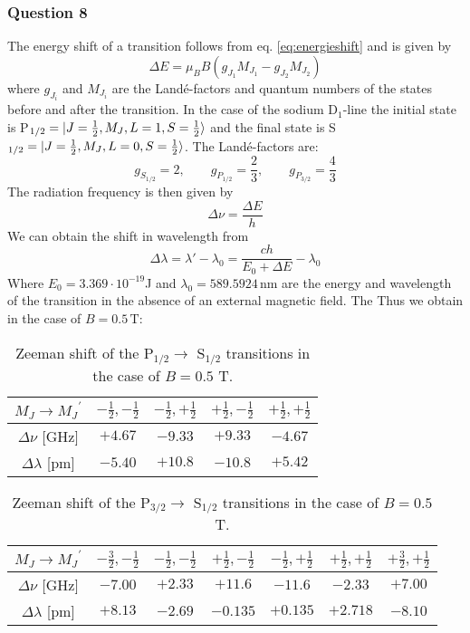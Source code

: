 \subsubsection{Question 8}
The energy shift of a transition follows from eq. \eqref{eq:energieshift} and is given by
\begin{equation}\Delta E=\mu_B B (g_{J_1}M_{J_1} - g_{J_2}M_{J_2}) \end{equation}
where $g_{J_i}$ and $M_{J_i}$ are the Landé-factors and quantum numbers of the states before and  after the transition. In the case of the sodium D$_1$-line the initial state is P$_{1/2}=\ket{J=\frac{1}{2},M_J,L=1,S=\frac{1}{2}}$  and the final state is S$_{1/2}=\ket{J=\frac{1}{2},M_J,L=0,S=\frac{1}{2}}$. The Landé-factors are:
\[g_{S_{1/2}}=2, \qquad g_{P_{1/2}}=\frac{2}{3}, \qquad g_{P_{3/2}}=\frac{4}{3} \]
%
The radiation frequency is then given by
\begin{equation}	\Delta\nu=\frac{\Delta E}{h} \end{equation} 
We can obtain the shift in wavelength from
\begin{equation}
	\Delta\lambda=\lambda'-\lambda_0=\frac{ch}{E_0+\Delta E}-\lambda_0
\end{equation}
Where $E_0=3.369\cdot 10^{-19}$J and $\lambda_0=589.5924 \,\si{\nano\metre}$ are the energy and wavelength of the transition in the absence of an external magnetic field.
The Thus we obtain in the case of $B=0.5 \,\si{\tesla}$:
\begin{table}
\begin{center}
	\begin{tabular}{ccccc}
		\toprule
		$M_J \to {M_J}^\prime $ & $-\frac{1}{2},-\frac{1}{2}$ & $-\frac{1}{2},+\frac{1}{2}$& $+\frac{1}{2},-\frac{1}{2}$& $+\frac{1}{2},+\frac{1}{2}$\\
		\midrule
		$\Delta\nu$ [GHz] & $+4.67$ &$-9.33$ &$+9.33$ &$-4.67$\\
		$\Delta\lambda$ [pm] & $-5.40$& $+10.8$& $-10.8$&$+5.42$\\
		\bottomrule
	\end{tabular}
\caption{Zeeman shift of the P$_{1/2} \to $ S$_{1/2}$ transitions in the case of $B=0.5$ T. }
\end{center}
\end{table}
\begin{table}
\begin{center}
	\begin{tabular}{ccccccc}
		\toprule
		$M_J \to {M_J}^\prime $ & $-\frac{3}{2},-\frac{1}{2}$ & $-\frac{1}{2},-\frac{1}{2}$& $+\frac{1}{2},-\frac{1}{2}$& $-\frac{1}{2},+\frac{1}{2}$&$+\frac{1}{2},+\frac{1}{2}$&$+\frac{3}{2},+\frac{1}{2}$ \\
		\midrule
		$\Delta\nu$ [GHz] & $-7.00$ &$+2.33$ &$+11.6$ &$-11.6$ &$-2.33$&$+7.00$\\
		$\Delta\lambda$ [pm] & $+8.13$& $-2.69$& $-0.135$&$+0.135$ &$+2.718$ & $-8.10$\\
		\bottomrule
	\end{tabular}
\end{center}
\caption{Zeeman shift of the P$_{3/2} \to $ S$_{1/2}$ transitions in the case of $B=0.5$ T.}
\end{table}
